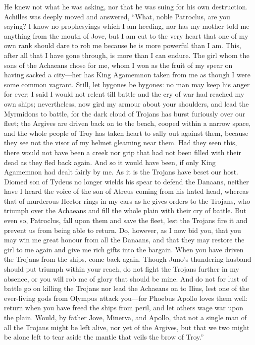 He knew not what he was asking, nor that he was suing for his own
destruction. Achilles was deeply moved and answered, “What, noble
Patroclus, are you saying? I know no prophesyings which I am heeding, nor
has my mother told me anything from the mouth of Jove, but I am cut to the
very heart that one of my own rank should dare to rob me because he is
more powerful than I am. This, after all that I have gone through, is more
than I can endure. The girl whom the sons of the Achaeans chose for me,
whom I won as the fruit of my spear on having sacked a city—her has
King Agamemnon taken from me as though I were some common vagrant. Still,
let bygones be bygones: no man may keep his anger for ever; I said I would
not relent till battle and the cry of war had reached my own ships;
nevertheless, now gird my armour about your shoulders, and lead the
Myrmidons to battle, for the dark cloud of Trojans has burst furiously
over our fleet; the Argives are driven back on to the beach, cooped within
a narrow space, and the whole people of Troy has taken heart to sally out
against them, because they see not the visor of my helmet gleaming near
them. Had they seen this, there would not have been a creek nor grip that
had not been filled with their dead as they fled back again. And so it
would have been, if only King Agamemnon had dealt fairly by me. As it is
the Trojans have beset our host. Diomed son of Tydeus no longer wields his
spear to defend the Danaans, neither have I heard the voice of the son of
Atreus coming from his hated head, whereas that of murderous Hector rings
in my cars as he gives orders to the Trojans, who triumph over the
Achaeans and fill the whole plain with their cry of battle. But even so,
Patroclus, fall upon them and save the fleet, lest the Trojans fire it and
prevent us from being able to return. Do, however, as I now bid you, that
you may win me great honour from all the Danaans, and that they may
restore the girl to me again and give me rich gifts into the bargain. When
you have driven the Trojans from the ships, come back again. Though Juno’s
thundering husband should put triumph within your reach, do not fight the
Trojans further in my absence, or you will rob me of glory that should be
mine. And do not for lust of battle go on killing the Trojans nor lead the
Achaeans on to Ilius, lest one of the ever-living gods from Olympus attack
you—for Phoebus Apollo loves them well: return when you have freed
the ships from peril, and let others wage war upon the plain. Would, by
father Jove, Minerva, and Apollo, that not a single man of all the Trojans
might be left alive, nor yet of the Argives, but that we two might be
alone left to tear aside the mantle that veils the brow of Troy.”

